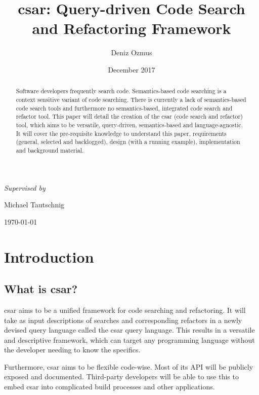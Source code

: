 \documentclass[12pt, letterpaper]{article}
\title{csar: Query-driven Code Search and Refactoring Framework}
\author{Deniz Ozmus}
\date{December 2017}
\def \supervisor {Michael Tautschnig}
\begin{document}
\nocite{*}

\begin{titlepage}
    \centering
    {\Large \MyTitle\par}
    \vspace{3cm}
    {\MyAuthor\par}
    \vspace{0.5cm}
    {\itshape Supervised by }{ \supervisor\par}
    \vspace{13cm}
    {\today\par}
\end{titlepage}

\begin{abstract}
    Software developers frequently search code.
    Semantics-based code searching is a context sensitive variant of code searching.
    There is currently a lack of semantics-based code search tools and furthermore no semantics-based, integrated code search and refactor tool.
    This paper will detail the creation of the csar (code search and refactor) tool, which aims to be versatile, query-driven, semantics-based and language-agnostic.
    It will cover the pre-requisite knowledge to understand this paper, requirements (general, selected and backlogged), design (with a running example), implementation and background material.
\end{abstract}
\newpage

\tableofcontents
\newpage

\section{Introduction}
\subsection{What is csar?}

csar aims to be a unified framework for code searching and refactoring. It will take as input descriptions of searches and corresponding refactors in a newly devised query language called the csar query language. This results in a versatile and descriptive framework, which can target any programming language without the developer needing to know the specifics.

Furthermore, csar aims to be flexible code-wise. Most of its API will be publicly exposed and documented. Third-party developers will be able to use this to embed csar into complicated build processes and other applications.
\end{document}
